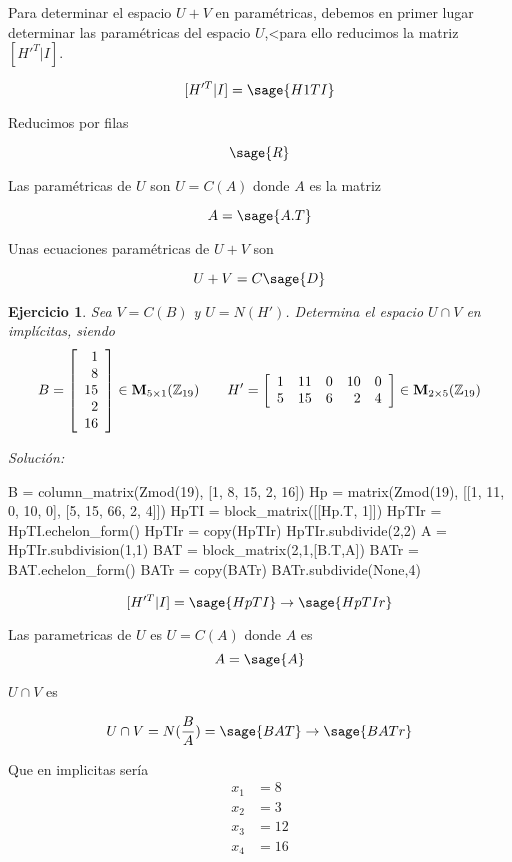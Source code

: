 \documentclass{amsart}
\newtheorem{ejer}{Ejercicio}
\begin{document}
Para determinar el espacio $U+V$ en paramétricas, debemos en primer lugar 
determinar las paramétricas del espacio $U$,<para ello reducimos la matriz 
$[H'^T|I]$.

$$ [H'^T|I] =  \sage{H1TI} $$

Reducimos por filas

$$ \sage{R} $$

Las paramétricas de $U$ son $U = C(A)$ donde $A$ es la matriz

$$ A = \sage{A.T} $$

Unas ecuaciones paramétricas de $U+V$ son 

$$ U+V = C\sage{D}  $$



\begin{ejer} Sea $V = C(B)$ y $U = N(H')$. Determina el espacio $U \cap V$ en impl\'icitas, siendo 
\[B = \left[\begin{array}{r}
1 \\
8 \\
15 \\
2 \\
16
\end{array}\right] \in {\bf M}_{5 \times 1}({\mathbb Z}_{19}) \qquad
H' = \left[\begin{array}{rrrrr}
1 & 11 & 0 & 10 & 0 \\
5 & 15 & 6 & 2 & 4
\end{array}\right] \in {\bf M}_{2 \times 5}({\mathbb Z}_{19}) \]
\end{ejer}

{\it Soluci\'on:}

\begin{sageblock}
B = column_matrix(Zmod(19), [1, 8, 15, 2, 16])
Hp = matrix(Zmod(19), [[1, 11, 0, 10, 0], [5, 15, 66, 2, 4]])
HpTI = block_matrix([[Hp.T, 1]])
HpTIr = HpTI.echelon_form()
HpTIr = copy(HpTIr)
HpTIr.subdivide(2,2)
A = HpTIr.subdivision(1,1)
BAT = block_matrix(2,1,[B.T,A])
BATr = BAT.echelon_form()
BATr = copy(BATr)
BATr.subdivide(None,4)
\end{sageblock}

$$
	[H'^T|I] = \sage{HpTI} \to \sage{HpTIr}
$$

Las parametricas de $U$ es $U = C(A)$ donde $A$ es
$$
	A = \sage{A}
$$

$U \cap V$ es

$$
	U \cap V = N(\frac{B}{A})  = \sage{BAT} \to \sage{BATr}
$$

Que en implicitas sería
\begin{align*}
	x_1 &= 8 \\
	x_2 &= 3 \\ 
	x_3 &= 12 \\
	x_4 &= 16 \\
\end{align*}

\end{document}
